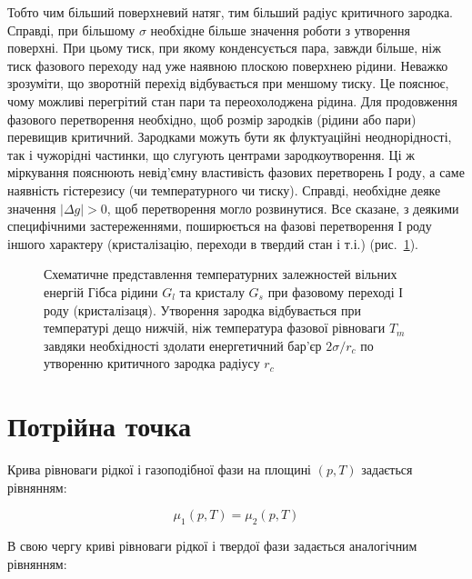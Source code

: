 Тобто чим більший поверхневий натяг, тим більший радіус критичного зародка. Справді, при більшому
$\sigma$ необхідне більше значення роботи з утворення поверхні. При цьому тиск, при якому
конденсується пара, завжди більше, ніж тиск фазового переходу над уже наявною плоскою поверхнею
рідини. Неважко зрозуміти, що зворотній перехід відбувається при меншому тиску. Це пояснює, чому
можливі перегрітий стан пари та переохолоджена рідина. Для продовження фазового перетворення
необхідно, щоб розмір зародків (рідини або пари) перевищив критичний. Зародками можуть бути як
флуктуаційні неоднорідності, так і чужорідні частинки, що слугують центрами зародкоутворення. Ці ж
міркування пояснюють невід'ємну властивість фазових перетворень І роду, а саме наявність гістерезису
(чи температурного чи тиску). Справді, необхідне деяке значення $|\Delta g|>0$, щоб перетворення могло
розвинутися. Все сказане, з деякими специфічними застереженнями, поширюється на фазові перетворення І
роду іншого характеру (кристалізацію, переходи в твердий стан і т.і.) (рис.~\ref{pic:Pic8}).

\begin{figure}[h!]\centering

\caption{Схематичне представлення температурних залежностей вільних енергій Гібса рідини $G_l$ та кристалу $G_s$ при фазовому переході І роду (кристалізаця). Утворення зародка відбувається при температурі дещо нижчій, ніж температура фазової рівноваги $T_m$ завдяки необхідності здолати енергетичний бар’єр $2\sigma/r_c$ по утворенню критичного зародка радіусу $r_c$}
\label{pic:Pic8}
\end{figure}

\section{Потрійна точка}

Крива рівноваги рідкої і газоподібної фази на площині $(p,T)$ задається рівнянням:

\begin{equation}\label{eq:liquid_gas_eq}
\mu_1(p,T) = \mu_2(p,T)
\end{equation}

В свою чергу криві рівноваги рідкої і твердої фази задається аналогічним рівнянням:

